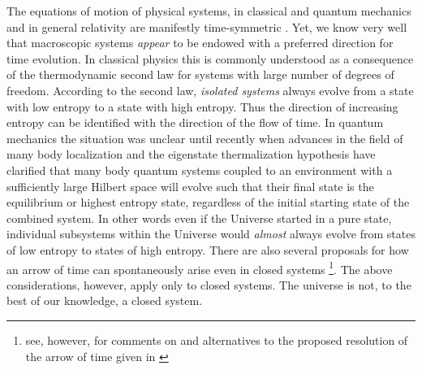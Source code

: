 \documentclass[preprint]{SciPost}
\theoremstyle{plain} %
\begin{document}
The equations of motion of physical systems, in classical and quantum mechanics and in general relativity are manifestly time-symmetric \cite{Ardakani2018Time,Roberts2012Time}. Yet, we know very well that macroscopic systems \emph{appear} to be endowed with a preferred direction for time evolution. In classical physics this is commonly understood as a consequence of the thermodynamic second law for systems with large number of degrees of freedom. According to the second law, \emph{isolated systems} always evolve from a state with low entropy to a state with high entropy. Thus the direction of increasing entropy can be identified with the direction of the flow of time. In quantum mechanics the situation was unclear until recently when advances in the field of many body localization and the eigenstate thermalization hypothesis \cite{Popescu2006Entanglement, Linden2009Quantum,Nandkishore2015Many-Body,Goold2016The-role} have clarified that many body quantum systems coupled to an environment with a sufficiently large Hilbert space will evolve such that their final state is the equilibrium or highest entropy state, regardless of the initial starting state of the combined system. In other words even if the Universe started in a pure state, individual subsystems within the Universe would \emph{almost} always evolve from states of low entropy to states of high entropy. There are also several proposals for how an arrow of time can spontaneously arise even in closed systems \cite{Maccone2009Quantum,Barbour2014The-Solution,Barbour2013A-Gravitational,Barbour2014Identification}\footnote{see, however, \cite{Jennings2010Entanglement,Jennings2009Comment,Maccone2009Quantum} for comments on and alternatives to the proposed resolution of the arrow of time given in \cite{Maccone2009Quantum}}. The above considerations, however, apply only to closed systems. The universe is not, to the best of our knowledge, a closed system.
\end{document}
